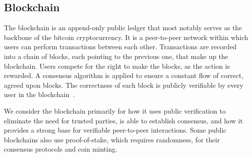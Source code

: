 \subsection{Blockchain}\label{subsec:blockchain}
The blockchain is an append-only public ledger that most notably serves as the backbone of the bitcoin cryptocurrency.
It is a peer-to-peer network within which users can perform transactions between each other.
Transactions are recorded into a chain of blocks, each pointing to the previous one, that make up the blockchain.
Users compete for the right to make the blocks, as the action is rewarded.
A consensus algorithm is applied to ensure a constant flow of correct, agreed upon blocks.
The correctness of each block is publicly verifiable by every user in the blockchain~\cite{nakamoto2008bitcoin}.

We consider the blockchain primarily for how it uses public verification to eliminate the need for trusted parties, is able to establish consensus, and how it provides a strong base for verifiable peer-to-peer interactions. Some public blockchains also use proof-of-stake, which requires randomness, for their consensus protocols and coin minting.
